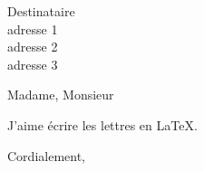 \documentclass[11pt]{lettre}
\makeatletter
\newcommand*{\NoRule}{\renewcommand*{\rule@length}{0}}
\makeatother
\begin{document}
 
\begin{letter}{Destinataire \\ 
        adresse 1 \\ 
		adresse 2\\ 
        adresse 3}
\NoRule    
{}
\address{Sovannara Hak\\76 Boulevard Ornano\\
        75018 Paris\\
        06 81 13 47 04\\
        hak.sovannara@gmail.com}
\nofax
\notelephone
 
\vspace{-4cm}
\def\concname{Objet :~} %
\opening{Madame, Monsieur}
 
J'aime écrire les lettres en \LaTeX.
 
\closing{Cordialement,}
 
\end{letter}
 
\end{document}
